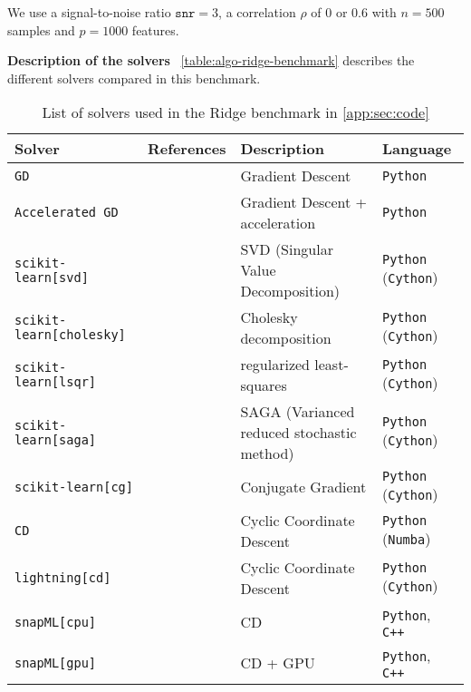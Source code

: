 \documentclass{article}
\newcommand{\myparagraph}[1]{\vspace{1mm}\noindent\textbf{#1} \,}
\begin{document}
We use a signal-to-noise ratio $\texttt{snr}=3$, a correlation $\rho$ of $0$ or $0.6$ with $n=500$ samples and $p=1000$ features.

\myparagraph{Description of the solvers} \autoref{table:algo-ridge-benchmark} describes the different solvers compared in this benchmark.

\begin{table}[h]
  \centering
  \footnotesize
  \caption{List of solvers used in the Ridge benchmark in \autoref{app:sec:code}}
  \addtolength{\tabcolsep}{-1pt}
\begin{tabular}{l l p{3cm} l}
  \toprule
  \textbf{Solver} & \textbf{References} & \textbf{Description} & \textbf{Language}\\
  \midrule
  \texttt{GD} &\citet{Boyd2004}
                 & Gradient Descent
                 & \texttt{Python}\\
  \texttt{Accelerated GD} &\citet{nesterov1983accelerated}
                 & Gradient Descent + acceleration
                 & \texttt{Python}\\
 \texttt{scikit-learn[svd]} & \citet{Pedregosa_11} & SVD (Singular Value Decomposition) & \texttt{Python} (\texttt{Cython})\\
  \texttt{scikit-learn[cholesky]} & \citet{Pedregosa_11} & Cholesky decomposition & \texttt{Python} (\texttt{Cython})\\
  \texttt{scikit-learn[lsqr]} & \citet{Pedregosa_11} & regularized least-squares & \texttt{Python} (\texttt{Cython})\\
  \texttt{scikit-learn[saga]} & \citet{Pedregosa_11} & SAGA (Varianced reduced stochastic method) & \texttt{Python} (\texttt{Cython})\\
    \texttt{scikit-learn[cg]} & \citet{Pedregosa_11} & Conjugate Gradient & \texttt{Python} (\texttt{Cython})\\
  \texttt{CD} & \citet{Bertsekas99} & Cyclic Coordinate Descent & \texttt{Python} (\texttt{Numba})\\
  \texttt{lightning[cd]} & \citet{Blondel2016} & Cyclic Coordinate Descent & \texttt{Python} (\texttt{Cython})\\
  \texttt{snapML[cpu]} &\citet{Dunner_18}
                     & CD
                     & \texttt{Python}, \texttt{C++}\\
    \texttt{snapML[gpu]} &\citet{Dunner_18}
                     & CD + GPU
                     & \texttt{Python}, \texttt{C++}\\
  \bottomrule
\end{tabular}
\label{table:algo-ridge-benchmark}
\end{table}
\end{document}
